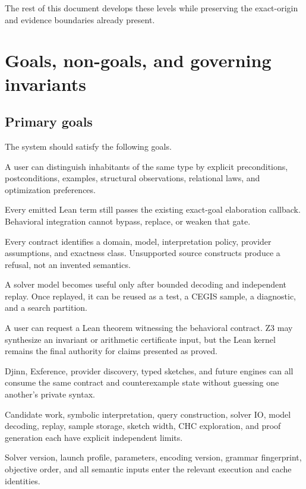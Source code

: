 \documentclass[11pt,oneside]{report}
\begin{document}
The rest of this document develops these levels while preserving the exact-origin and evidence boundaries already present.

\chapter{Goals, non-goals, and governing invariants}
\label{chap:goals}

\section{Primary goals}

The system should satisfy the following goals.

\begin{description}[leftmargin=2.2em,style=nextline]
\item[Behavioral precision.] A user can distinguish inhabitants of the same type by explicit preconditions, postconditions, examples, structural observations, relational laws, and optimization preferences.

\item[No regression in type soundness.] Every emitted Lean term still passes the existing exact-goal elaboration callback. Behavioral integration cannot bypass, replace, or weaken that gate.

\item[Explicit semantic scope.] Every contract identifies a domain, model, interpretation policy, provider assumptions, and exactness class. Unsupported source constructs produce a refusal, not an invented semantics.

\item[Counterexample productivity.] A solver model becomes useful only after bounded decoding and independent replay. Once replayed, it can be reused as a test, a CEGIS sample, a diagnostic, and a search partition.

\item[Positive-proof path.] A user can request a Lean theorem witnessing the behavioral contract. Z3 may synthesize an invariant or arithmetic certificate input, but the Lean kernel remains the final authority for claims presented as proved.

\item[Search compositionality.] Djinn, Exference, provider discovery, typed sketches, and future engines can all consume the same contract and counterexample state without guessing one another's private syntax.

\item[Bounded operation.] Candidate work, symbolic interpretation, query construction, solver IO, model decoding, replay, sample storage, sketch width, CHC exploration, and proof generation each have explicit independent limits.

\item[Reproducibility.] Solver version, launch profile, parameters, encoding version, grammar fingerprint, objective order, and all semantic inputs enter the relevant execution and cache identities.
\end{description}
\end{document}
